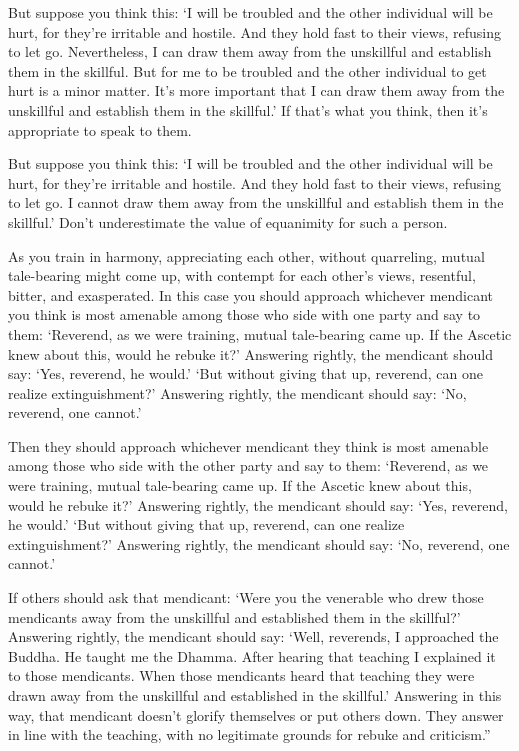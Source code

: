 \documentclass[12pt,openany]{book}%
\begin{document}
But suppose you think this: ‘I will be troubled and the other individual will be hurt, for they’re irritable and hostile. And they hold fast to their views, refusing to let go. Nevertheless, I can draw them away from the unskillful and establish them in the skillful. But for me to be troubled and the other individual to get hurt is a minor matter. It’s more important that I can draw them away from the unskillful and establish them in the skillful.’ If that’s what you think, then it’s appropriate to speak to them. 

But suppose you think this: ‘I will be troubled and the other individual will be hurt, for they’re irritable and hostile. And they hold fast to their views, refusing to let go. I cannot draw them away from the unskillful and establish them in the skillful.’ Don’t underestimate the value of equanimity for such a person. 

As you train in harmony, appreciating each other, without quarreling, mutual tale-bearing might come up, with contempt for each other’s views, resentful, bitter, and exasperated. In this case you should approach whichever mendicant you think is most amenable among those who side with one party and say to them: ‘Reverend, as we were training, mutual tale-bearing came up. If the Ascetic knew about this, would he rebuke it?’ Answering rightly, the mendicant should say: ‘Yes, reverend, he would.’ ‘But without giving that up, reverend, can one realize extinguishment?’ Answering rightly, the mendicant should say: ‘No, reverend, one cannot.’ 

Then they should approach whichever mendicant they think is most amenable among those who side with the other party and say to them: ‘Reverend, as we were training, mutual tale-bearing came up. If the Ascetic knew about this, would he rebuke it?’ Answering rightly, the mendicant should say: ‘Yes, reverend, he would.’ ‘But without giving that up, reverend, can one realize extinguishment?’ Answering rightly, the mendicant should say: ‘No, reverend, one cannot.’ 

If others should ask that mendicant: ‘Were you the venerable who drew those mendicants away from the unskillful and established them in the skillful?’ Answering rightly, the mendicant should say: ‘Well, reverends, I approached the Buddha. He taught me the Dhamma. After hearing that teaching I explained it to those mendicants. When those mendicants heard that teaching they were drawn away from the unskillful and established in the skillful.’ Answering in this way, that mendicant doesn’t glorify themselves or put others down. They answer in line with the teaching, with no legitimate grounds for rebuke and criticism.” 
\end{document}
